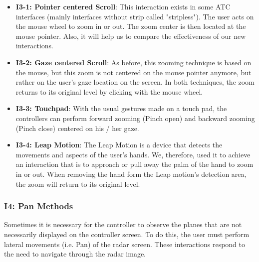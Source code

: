\begin{itemize}

\item  \textbf{I3-1: Pointer centered Scroll}: This interaction exists in some ATC interfaces (mainly interfaces without strip called "stripless"). The user acts on
the mouse wheel to zoom in or out. The zoom center is then
located at the mouse pointer. Also, it will help us to compare
the effectiveness of our new interactions.

\item \textbf{I3-2: Gaze centered Scroll}: As before, this zooming technique is based on the mouse, but
this zoom is not centered on the mouse pointer anymore, but
rather on the user's gaze location on the screen. In both
techniques, the zoom returns to its original level by clicking
with the mouse wheel.

\item \textbf{I3-3: Touchpad}: With the usual gestures made on a touch pad, the controllers can perform forward zooming (Pinch open) and backward
zooming (Pinch close) centered on his / her gaze.

\item \textbf{I3-4: Leap Motion}: The Leap Motion is a device that detects the movements and
aspects of the user's hands. We, therefore, used it to achieve
an interaction that is to approach or pull away the palm of
the hand to zoom in or out. When removing the hand form
the Leap motion's detection area, the zoom will return to
its original level.


\end{itemize}




\subsubsection{I4: Pan Methods}
Sometimes it is necessary for the controller to observe the
planes that are not necessarily displayed on the controller
screen. To do this, the user must perform lateral movements
(i.e. Pan) of the radar screen. These interactions respond to
the need to navigate through the radar image.


